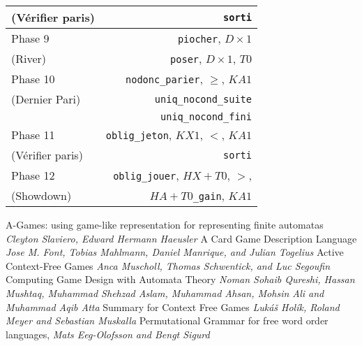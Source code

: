 \documentclass{cours}
\begin{document}
\begin{table}
\begin{tabular}{lr}
        (Vérifier paris) & \texttt{sorti}\\
        \midrule
        Phase 9 & \texttt{piocher}, $D \times 1$\\
        (River) & \texttt{poser}, $D\times 1$, $T0$\\
        \midrule
        Phase 10 & \texttt{nodonc\_parier}, $\geq$, $KA1$\\
        (Dernier Pari) & \texttt{uniq\_nocond\_suite}\\
        & \texttt{uniq\_nocond\_fini}\\
        \midrule
        Phase 11 & \texttt{oblig\_jeton}, $KX1$, $<$, $KA1$\\
        (Vérifier paris) & \texttt{sorti}\\
        \midrule
        Phase 12 & \texttt{oblig\_jouer}, $HX + T0$, $>$,\\
        (Showdown) & $HA + T0$\texttt{\_gain}, $KA1$\\
        \bottomrule
    \end{tabular}
\end{table}

\newpage
\begin{thebibliography}{5}
     A-Games: using game-like representation for representing finite automatas \textit{Cleyton Slaviero, Edward Hermann Haeusler}
     A Card Game Description Language \textit{Jose M. Font, Tobias Mahlmann, Daniel Manrique, and Julian Togelius}
     Active Context-Free Games \textit{Anca Muscholl, Thomas Schwentick, and Luc Segoufin}
     Computing Game Design with Automata Theory \textit{Noman Sohaib Qureshi, Hassan Mushtaq, Muhammad Shehzad Aslam, Muhammad Ahsan, Mohsin Ali and Muhammad Aqib Atta}
     Summary for Context Free Games \textit{Lukáš Holík, Roland Meyer and Sebastian Muskalla}
     Permutational Grammar for free word order languages, \textit{Mats Eeg-Olofsson and Bengt Sigurd}
\end{thebibliography}
\end{document}
